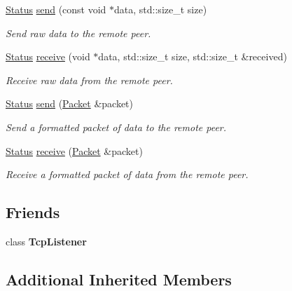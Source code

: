 \begin{DoxyCompactItemize}
\hyperlink{classsf_1_1_socket_a51bf0fd51057b98a10fbb866246176dc}{Status} \hyperlink{classsf_1_1_tcp_socket_affce26ab3bcc4f5b9269dad79db544c0}{send} (const void $\ast$data, std\+::size\+\_\+t size)
\begin{DoxyCompactList}\small\item\em Send raw data to the remote peer. \end{DoxyCompactList}\item 
\hyperlink{classsf_1_1_socket_a51bf0fd51057b98a10fbb866246176dc}{Status} \hyperlink{classsf_1_1_tcp_socket_a90ce50811ea61d4f00efc62bb99ae1af}{receive} (void $\ast$data, std\+::size\+\_\+t size, std\+::size\+\_\+t \&received)
\begin{DoxyCompactList}\small\item\em Receive raw data from the remote peer. \end{DoxyCompactList}\item 
\hyperlink{classsf_1_1_socket_a51bf0fd51057b98a10fbb866246176dc}{Status} \hyperlink{classsf_1_1_tcp_socket_a0f8276e2b1c75aac4a7b0a707b250f44}{send} (\hyperlink{classsf_1_1_packet}{Packet} \&packet)
\begin{DoxyCompactList}\small\item\em Send a formatted packet of data to the remote peer. \end{DoxyCompactList}\item 
\hyperlink{classsf_1_1_socket_a51bf0fd51057b98a10fbb866246176dc}{Status} \hyperlink{classsf_1_1_tcp_socket_aa655352609bc9804f2baa020df3e7331}{receive} (\hyperlink{classsf_1_1_packet}{Packet} \&packet)
\begin{DoxyCompactList}\small\item\em Receive a formatted packet of data from the remote peer. \end{DoxyCompactList}\end{DoxyCompactItemize}
\subsection*{Friends}
\begin{DoxyCompactItemize}
\item 
\hypertarget{classsf_1_1_tcp_socket_a2b2dd140834917bd44b512236bddea7c}{class {\bfseries Tcp\+Listener}}\label{classsf_1_1_tcp_socket_a2b2dd140834917bd44b512236bddea7c}

\end{DoxyCompactItemize}
\subsection*{Additional Inherited Members}


